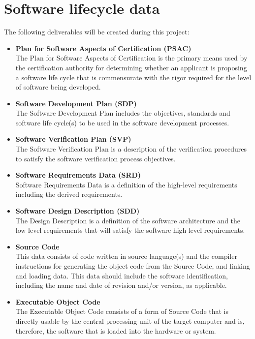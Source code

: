 \documentclass[a4paper]{article}
\begin{document}
\section{Software lifecycle data}

The following deliverables will be created during this project:

\begin{itemize}
	\item \textbf{Plan for Software Aspects of Certification (PSAC)}\\
		The Plan for Software Aspects of Certification is the primary means used by the certification authority for determining whether an applicant is proposing a software life cycle that is commensurate with the rigor required for the level of software being developed.
	\item \textbf{Software Development Plan (SDP)}\\
		The Software Development Plan includes the objectives, standards and software life cycle(s) to be used in the software development processes.
	\item \textbf{Software Verification Plan (SVP)}\\
		The Software Verification Plan is a description of the verification procedures to satisfy the software verification process objectives.
	\item \textbf{Software Requirements Data (SRD)}\\
		Software Requirements Data is a definition of the high-level requirements including the derived requirements.
	\item \textbf{Software Design Description (SDD)}\\
		The Design Description is a definition of the software architecture and the low-level requirements that will satisfy the software high-level requirements.
	\item \textbf{Source Code}\\
		This data consists of code written in source language(s) and the compiler instructions for generating the object code from the Source Code, and linking and loading data. This data should include the software identification, including the name and date of revision and/or version, as applicable.
	\item \textbf{Executable Object Code}\\
		The Executable Object Code consists of a form of Source Code that is directly usable by the central processing unit of the target computer and is, therefore, the software that is loaded into the hardware or system.

\end{itemize}
\end{document}
